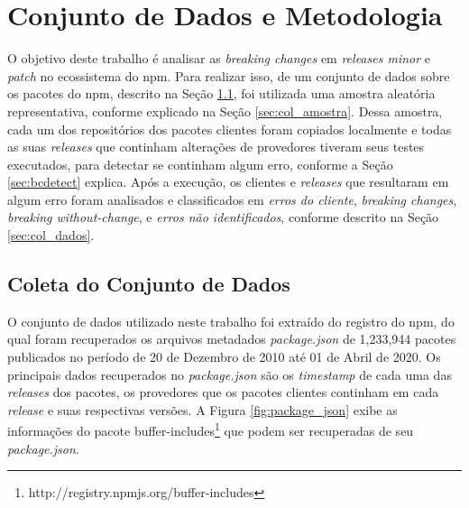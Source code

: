 \chapter{Conjunto de Dados e Metodologia}
\label{cap:metodologia}

O objetivo deste trabalho é analisar as \textit{breaking changes} em \textit{releases minor} e \textit{patch} no ecossistema do \textsf{npm}. Para realizar isso, de um conjunto de dados sobre os pacotes do \textsf{npm}, descrito na Seção \ref{sec:col_base}, foi utilizada uma amostra aleatória representativa, conforme explicado na Seção \ref{sec:col_amostra}. Dessa amostra, cada um dos repositórios dos pacotes clientes foram copiados localmente e todas as suas \textit{releases} que continham alterações de provedores tiveram seus testes executados, para detectar se continham algum erro, conforme a Seção \ref{sec:bcdetect} explica. Após a execução, os clientes e \textit{releases} que resultaram em algum erro foram analisados e classificados em \textit{erros do cliente}, \textit{breaking changes}, \textit{breaking without-change}, e \textit{erros não identificados}, conforme descrito na Seção \ref{sec:col_dados}.

\section{Coleta do Conjunto de Dados}
\label{sec:col_base}
O conjunto de dados utilizado neste trabalho foi extraído do registro do \textsf{npm}, do qual foram recuperados os arquivos metadados \textit{package.json} de 1,233,944 pacotes publicados no período de 20 de Dezembro de 2010 até 01 de Abril de 2020. Os principais dados recuperados no \textit{package.json} são os \textit{timestamp} de cada uma das \textit{releases} dos pacotes, os provedores que os pacotes clientes continham em cada \textit{release} e suas respectivas versões. A Figura \ref{fig:package_json} exibe as informações do pacote \textsf{buffer-includes}\footnote{http://registry.npmjs.org/buffer-includes} que podem ser recuperadas de seu \textit{package.json}.

